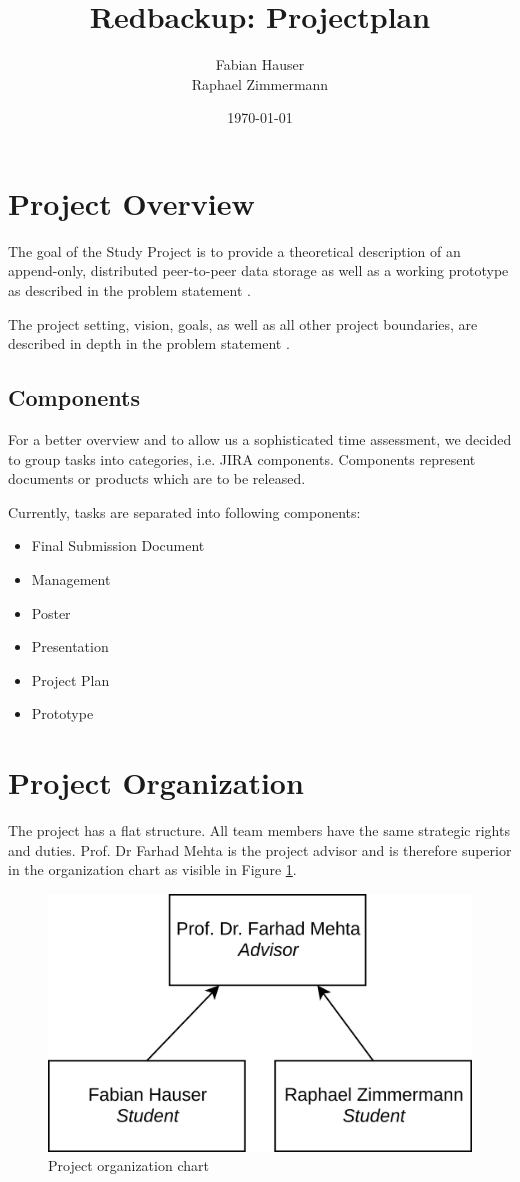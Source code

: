 \documentclass[a4paper]{article}
\title{Redbackup: Projectplan}
\author{
		Fabian Hauser \\
		Raphael Zimmermann
}
\date{\today}
\begin{document}
\maketitle

\section{Project Overview}
The goal of the Study Project is to provide a theoretical description of an append-only, distributed peer-to-peer data storage as well as a working prototype as described in the problem statement \cite{problemstatement}.

The project setting, vision, goals, as well as all other project boundaries, are described in depth in the problem statement \cite{problemstatement}.

\subsection{Components}

For a better overview and to allow us a sophisticated time assessment, we decided to group tasks into categories, i.e. JIRA components. Components represent documents or products which are to be released.

Currently, tasks are separated into following components:

\begin{multicols}{2}
	\begin{itemize}
		\item Final Submission Document
		\item Management
		\item Poster
		\item Presentation
		\item Project Plan
		\item Prototype
	\end{itemize}
\end{multicols}

\section{Project Organization}

The project has a flat structure. All team members have the same strategic rights and duties. Prof. Dr Farhad Mehta is the project advisor and is therefore superior in the organization chart as visible in Figure \ref{fig:organigram}.

\begin{figure}[H]
	\centering
	\includegraphics[width=0.5\linewidth]{resources/organigram}
	\caption[Organigram]{Project organization chart}
	\label{fig:organigram}
\end{figure}
\end{document}
